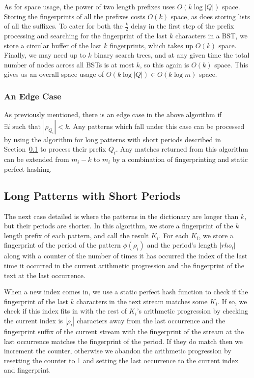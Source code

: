 \documentclass[ %
                    author={Dominic Joseph Moylett},
                    degree={MEng},
                     title={Dictionary Matching with Fingerprints},
                  subtitle={An Empirical Analysis},
                      type={Research},
                      year={2014} ]{dissertation}
\begin{document}
As for space usage, the power of two length prefixes uses $O(k\log|Q|)$ space. Storing the fingerprints of all the prefixes costs $O(k)$ space, as does storing lists of all the suffixes. To cater for both the $\frac{k}{2}$ delay in the first step of the prefix processing and searching for the fingerprint of the last $k$ characters in a BST, we store a circular buffer of the last $k$ fingerprints, which takes up $O(k)$ space. Finally, we may need up to $k$ binary search trees, and at any given time the total number of nodes across all BSTs is at most $k$, so this again is $O(k)$ space. This gives us an overall space usage of $O(k\log|Q|) \in O(k\log m)$ space.

\subsubsection{An Edge Case}
\label{sssec:edge-case-theory}

As previously mentioned, there is an edge case in the above algorithm if $\exists i \text{ such that } |\rho_{Q_i}| < k$. Any patterns which fall under this case can be processed by using the algorithm for long patterns with short periods described in Section~\ref{ssec:periodic-theory} to process their prefix $Q_i$. Any matches returned from this algorithm can be extended from $m_i - k$ to $m_i$ by a combination of fingerprinting and static perfect hashing.

\subsection{Long Patterns with Short Periods}
\label{ssec:periodic-theory}

The next case detailed is where the patterns in the dictionary are longer than $k$, but their periods are shorter. In this algorithm, we store a fingerprint of the $k$ length prefix of each pattern, and call the result $K_i$. For each $K_i$, we store a fingerprint of the period of the pattern $\phi(\rho_i)$ and the period's length $|rho_i|$ along with a counter of the number of times it has occurred the index of the last time it occurred in the current arithmetic progression and the fingerprint of the text at the last occurrence.

When a new index comes in, we use a static perfect hash function to check if the fingerprint of the last $k$ characters in the text stream matches some $K_i$. If so, we check if this index fits in with the rest of $K_i$'s arithmetic progression by checking the current index is $|\rho_i|$ characters away from the last occurrence and the fingerprint suffix of the current stream with the fingerprint of the stream at the last occurrence matches the fingerprint of the period. If they do match then we increment the counter, otherwise we abandon the arithmetic progression by resetting the counter to 1 and setting the last occurrence to the current index and fingerprint.
\end{document}
